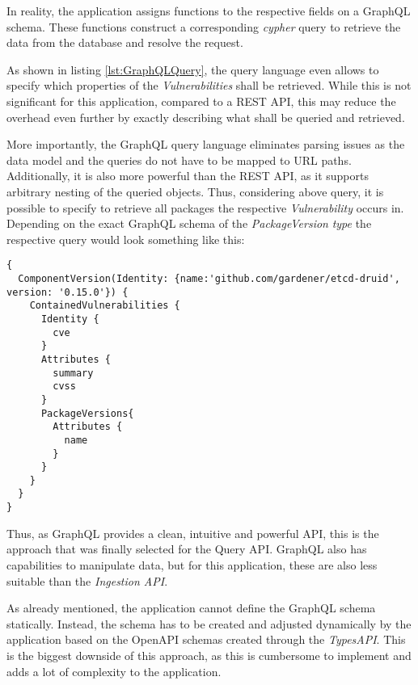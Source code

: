 In reality, the application assigns functions to the respective fields on a GraphQL schema. These functions construct a corresponding \emph{cypher} query to retrieve the data from the database and resolve the request.\par
As shown in listing \ref{lst:GraphQLQuery}, the query language even allows to specify which properties of the \emph{Vulnerabilities} shall be retrieved. While this is not significant for this application, compared to a REST API, this may reduce the overhead even further by exactly describing what shall be queried and retrieved.\par 
More importantly, the GraphQL query language eliminates parsing issues as the data model and the queries do not have to be mapped to URL paths. Additionally, it is also more powerful than the REST API, as it supports arbitrary nesting of the queried objects. Thus, considering above query, it is possible to specify to retrieve all packages the respective \emph{Vulnerability} occurs in. Depending on the exact GraphQL schema of the \emph{PackageVersion} \emph{type} the respective query would look something like this:\\

\begin{lstlisting}[caption=Nested GraphQL Query, captionpos=b, label=lst:NestedGraphQLQuery]
{
  ComponentVersion(Identity: {name:'github.com/gardener/etcd-druid', version: '0.15.0'}) {
    ContainedVulnerabilities {
      Identity {
        cve
      }
      Attributes {
        summary
        cvss 
      }
      PackageVersions{
        Attributes {
          name
        }
      }
    }
  }
}
\end{lstlisting}

Thus, as GraphQL provides a clean, intuitive and powerful API, this is the approach that was finally selected for the Query API. GraphQL also has capabilities to manipulate data, but for this application, these are also less suitable than the \emph{Ingestion API}.\par
As already mentioned, the application cannot define the GraphQL schema statically. Instead, the schema has to be created and adjusted dynamically by the application based on the OpenAPI schemas created through the \emph{TypesAPI}. This is the biggest downside of this approach, as this is cumbersome to implement and adds a lot of complexity to the application.

